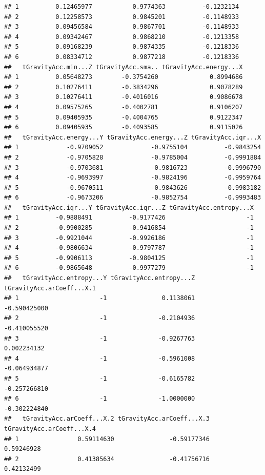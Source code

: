 \documentclass[
]{article}
\begin{document}
\begin{verbatim}
## 1          0.12465977           0.9774363          -0.1232134
## 2          0.12258573           0.9845201          -0.1148933
## 3          0.09456584           0.9867701          -0.1148933
## 4          0.09342467           0.9868210          -0.1213358
## 5          0.09168239           0.9874335          -0.1218336
## 6          0.08334712           0.9877218          -0.1218336
##   tGravityAcc.min...Z tGravityAcc.sma.. tGravityAcc.energy...X
## 1          0.05648273        -0.3754260              0.8994686
## 2          0.10276411        -0.3834296              0.9078289
## 3          0.10276411        -0.4016016              0.9086678
## 4          0.09575265        -0.4002781              0.9106207
## 5          0.09405935        -0.4004765              0.9122347
## 6          0.09405935        -0.4093585              0.9115026
##   tGravityAcc.energy...Y tGravityAcc.energy...Z tGravityAcc.iqr...X
## 1             -0.9709052             -0.9755104          -0.9843254
## 2             -0.9705828             -0.9785004          -0.9991884
## 3             -0.9703681             -0.9816723          -0.9996790
## 4             -0.9693997             -0.9824196          -0.9959764
## 5             -0.9670511             -0.9843626          -0.9983182
## 6             -0.9673206             -0.9852754          -0.9993483
##   tGravityAcc.iqr...Y tGravityAcc.iqr...Z tGravityAcc.entropy...X
## 1          -0.9888491          -0.9177426                      -1
## 2          -0.9900285          -0.9416854                      -1
## 3          -0.9921044          -0.9926186                      -1
## 4          -0.9806634          -0.9797787                      -1
## 5          -0.9906113          -0.9804125                      -1
## 6          -0.9865648          -0.9977279                      -1
##   tGravityAcc.entropy...Y tGravityAcc.entropy...Z tGravityAcc.arCoeff...X.1
## 1                      -1               0.1138061              -0.590425000
## 2                      -1              -0.2104936              -0.410055520
## 3                      -1              -0.9267763               0.002234132
## 4                      -1              -0.5961008              -0.064934877
## 5                      -1              -0.6165782              -0.257266810
## 6                      -1              -1.0000000              -0.302224840
##   tGravityAcc.arCoeff...X.2 tGravityAcc.arCoeff...X.3 tGravityAcc.arCoeff...X.4
## 1                0.59114630               -0.59177346                0.59246928
## 2                0.41385634               -0.41756716                0.42132499

\end{verbatim}
\end{document}
